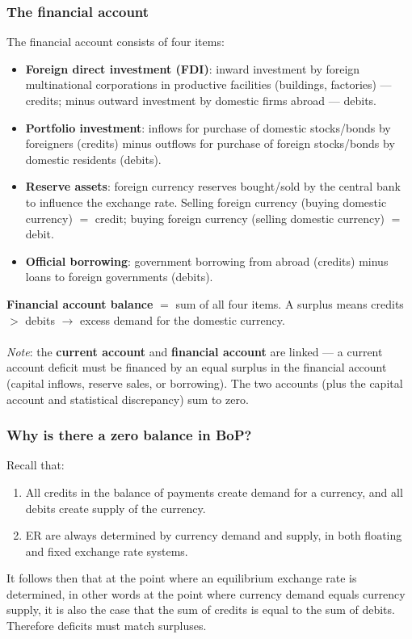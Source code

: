 \documentclass[a4paper,12pt]{article}
\begin{document}
\subsubsection*{The financial account}
The financial account consists of four items:
\begin{itemize}
  \item \textbf{Foreign direct investment (FDI)}: inward investment by foreign multinational corporations in productive facilities (buildings, factories) --- credits; minus outward investment by domestic firms abroad --- debits.
  \item \textbf{Portfolio investment}: inflows for purchase of domestic stocks/bonds by foreigners (credits) minus outflows for purchase of foreign stocks/bonds by domestic residents (debits).
  \item \textbf{Reserve assets}: foreign currency reserves bought/sold by the central bank to influence the exchange rate. Selling foreign currency (buying domestic currency) $=$ credit; buying foreign currency (selling domestic currency) $=$ debit.
  \item \textbf{Official borrowing}: government borrowing from abroad (credits) minus loans to foreign governments (debits).
\end{itemize}
\textbf{Financial account balance} $=$ sum of all four items. A surplus means credits $>$ debits $\to$ excess demand for the domestic currency.\\\\
\textit{Note}: the \textbf{current account} and \textbf{financial account} are linked --- a current account deficit must be financed by an equal surplus in the financial account (capital inflows, reserve sales, or borrowing). The two accounts (plus the capital account and statistical discrepancy) sum to zero.
\subsubsection*{Why is there a zero balance in BoP?}
Recall that:
\begin{enumerate}
  \item All credits in the balance of payments create demand for a currency, and all debits create supply of the currency.
  \item ER are always determined by currency demand and supply, in both floating and fixed exchange rate systems.
\end{enumerate}
It follows then that at the point where an equilibrium exchange rate is determined, in other words at the point where currency demand equals currency supply, it is also the case that the sum of credits is equal to the sum of debits. Therefore deficits must match surpluses.
\end{document}
